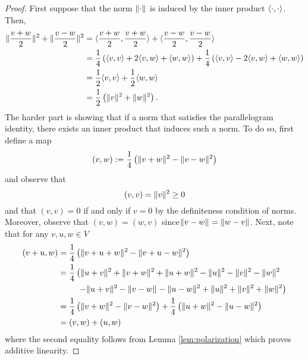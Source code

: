 \begin{proof}
First suppose that the norm $\lVert\cdot\rVert_{}$ is induced by the inner
product $\langle\cdot,\cdot\rangle$. Then, 
\begin{align*}
\lVert\frac{v+w}{2}\rVert_{}^{2}+\lVert\frac{v-w}{2}\rVert_{}^{2} & =\langle\frac{v+w}{2},\frac{v+w}{2}\rangle+\langle\frac{v-w}{2},\frac{v-w}{2}\rangle\\
 & =\frac{1}{4}\left(\langle v,v\rangle+2\langle v,w\rangle+\langle w,w\rangle\right)+\frac{1}{4}\left(\langle v,v\rangle-2\langle v,w\rangle+\langle w,w\rangle\right)\\
 & =\frac{1}{2}\langle v,v\rangle+\frac{1}{2}\langle w,w\rangle\\
 & =\frac{1}{2}\left(\lVert v\rVert_{}^{2}+\lVert w\rVert_{}^{2}\right).
\end{align*}
The harder part is showing that if a norm that satisfies the parallelogram
identity, there exists an inner product that induces such a norm.
To do so, first define a map
\[
\left(v,w\right):=\frac{1}{4}\left(\lVert v+w\rVert_{}^{2}-\lVert v-w\rVert_{}^{2}\right)
\]
 and observe that 
\[
\left(v,v\right)=\lVert v\rVert_{}^{2}\geq0
\]
and that $\left(v,v\right)=0$ if and only if $v=0$ by the definiteness
condition of norms. Moreover, observe that $\left(v,w\right)=\left(w,v\right)$
since$\lVert v-w\rVert_{}=\lVert w-v\rVert_{}$. Next, note that for any $v,u,w\in V$
\begin{align*}
\left(v+u,w\right) & =\frac{1}{4}\left(\pnorm{v+u+w}{}^{2}-\pnorm{v+u-w}{}^{2}\right)\\
 & =\frac{1}{4}\left(\pnorm{u+v}{}^{2}+\pnorm{v+w}{}^{2}+\pnorm{u+w}{}^{2}-\pnorm u{}^{2}-\pnorm v{}^{2}-\pnorm w{}^{2}\right.\\
 & \ \ \ \ \left.\ \ \ -\pnorm{u+v}{}^{2}-\pnorm{v-w}{}-\pnorm{u-w}{}^{2}+\pnorm u{}^{2}+\pnorm v{}^{2}+\pnorm w{}^{2}\right)\\
 & =\frac{1}{4}\left(\pnorm{v+w}{}^{2}-\pnorm{v-w}{}^{2}\right)+\frac{1}{4}\left(\pnorm{u+w}{}^{2}-\pnorm{u-w}{}^{2}\right)\\
 & =\left(v,w\right)+\left(u,w\right)
\end{align*}
where the second equality follows from Lemma \ref{lem:polarization}
which proves additive linearity.


\end{proof}
